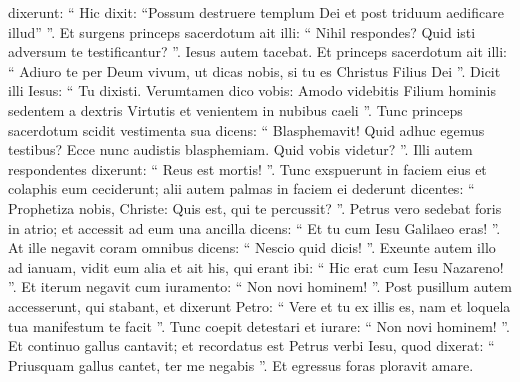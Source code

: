 \begin{biblechapter}
\begin{biblechapter}
\begin{biblechapter}
\begin{biblechapter}
\begin{biblechapter}
\begin{biblechapter}
\begin{biblechapter}
\begin{biblechapter}
\begin{biblechapter}
\begin{biblechapter}
\begin{biblechapter}
\begin{biblechapter}
\begin{biblechapter}
\begin{biblechapter}
\begin{biblechapter}
\begin{biblechapter}
\begin{biblechapter}
\begin{biblechapter}
\begin{biblechapter}
\begin{biblechapter}
\begin{biblechapter}
\begin{biblechapter}
\begin{biblechapter}
\begin{biblechapter}
\begin{biblechapter}
\begin{biblechapter}
 \verse dixerunt: “ Hic dixit: “Possum destruere templum Dei et post triduum aedificare illud” ”. 
\verse Et surgens princeps sacerdotum ait illi: “ Nihil respondes? Quid isti adversum te testificantur? ”. 
\verse Iesus autem tacebat. Et princeps sacerdotum ait illi: “ Adiuro te per Deum vivum, ut dicas nobis, si tu es Christus Filius Dei ”. 
\verse Dicit illi Iesus: “ Tu dixisti. Verumtamen dico vobis: Amodo videbitis Filium hominis sedentem a dextris Virtutis et venientem in nubibus caeli ”.
 \verse Tunc princeps sacerdotum scidit vestimenta sua dicens: “ Blasphemavit! Quid adhuc egemus testibus? Ecce nunc audistis blasphemiam. 
\verse Quid vobis videtur? ”. Illi autem respondentes dixerunt: “ Reus est mortis! ”. 
\verse Tunc exspuerunt in faciem eius et colaphis eum ceciderunt; alii autem palmas in faciem ei dederunt 
\verse dicentes: “ Prophetiza nobis, Christe: Quis est, qui te percussit? ”.
 \verse Petrus vero sedebat foris in atrio; et accessit ad eum una ancilla dicens: “ Et tu cum Iesu Galilaeo eras! ”. 
\verse At ille negavit coram omnibus dicens: “ Nescio quid dicis! ”. 
\verse Exeunte autem illo ad ianuam, vidit eum alia et ait his, qui erant ibi: “ Hic erat cum Iesu Nazareno! ”. 
\verse Et iterum negavit cum iuramento: “ Non novi hominem! ”. 
\verse Post pusillum autem accesserunt, qui stabant, et dixerunt Petro: “ Vere et tu ex illis es, nam et loquela tua manifestum te facit ”. 
\verse Tunc coepit detestari et iurare: “ Non novi hominem! ”. Et continuo gallus cantavit; 
\verse et recordatus est Petrus verbi Iesu, quod dixerat: “ Priusquam gallus cantet, ter me negabis ”. Et egressus foras ploravit amare.
 

\end{biblechapter}
\end{biblechapter}
\end{biblechapter}
\end{biblechapter}
\end{biblechapter}
\end{biblechapter}
\end{biblechapter}
\end{biblechapter}
\end{biblechapter}
\end{biblechapter}
\end{biblechapter}
\end{biblechapter}
\end{biblechapter}
\end{biblechapter}
\end{biblechapter}
\end{biblechapter}
\end{biblechapter}
\end{biblechapter}
\end{biblechapter}
\end{biblechapter}
\end{biblechapter}
\end{biblechapter}
\end{biblechapter}
\end{biblechapter}
\end{biblechapter}
\end{biblechapter}
